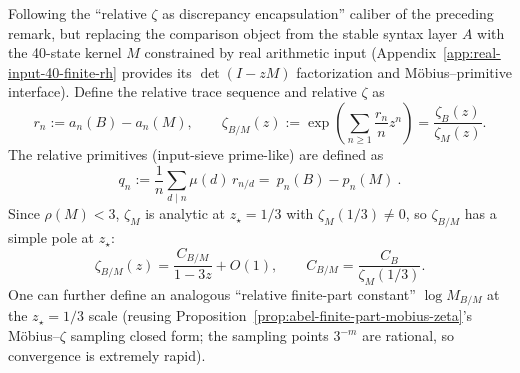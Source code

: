 \begin{remark}\label{rem:relative-zeta-sync-vs-real-input}
Following the ``relative \(\zeta\) as discrepancy encapsulation'' caliber of the preceding remark, but replacing the comparison object from the stable syntax layer \(A\) with the 40-state kernel \(M\) constrained by real arithmetic input (Appendix~\ref{app:real-input-40-finite-rh} provides its \(\det(I-zM)\) factorization and M\"obius--primitive interface).
Define the relative trace sequence and relative \(\zeta\) as
\[
r_n:=a_n(B)-a_n(M),\qquad
\zeta_{B/M}(z):=\exp\!\left(\sum_{n\ge 1}\frac{r_n}{n}z^n\right)=\frac{\zeta_B(z)}{\zeta_M(z)}.
\]
The relative primitives (input-sieve prime-like) are defined as
\[
q_n:=\frac{1}{n}\sum_{d\mid n}\mu(d)\,r_{n/d}=\boxed{\ p_n(B)-p_n(M)\ }.
\]
Since \(\rho(M)<3\), \(\zeta_M\) is analytic at \(z_\star=1/3\) with \(\zeta_M(1/3)\neq 0\), so \(\zeta_{B/M}\) has a simple pole at \(z_\star\):
$$
\zeta_{B/M}(z)=\frac{C_{B/M}}{1-3z}+O(1),
\qquad
C_{B/M}=\frac{C_B}{\zeta_M(1/3)}.
$$
One can further define an analogous ``relative finite-part constant'' \(\log M_{B/M}\) at the \(z_\star=1/3\) scale (reusing Proposition~\ref{prop:abel-finite-part-mobius-zeta}'s M\"obius--\(\zeta\) sampling closed form; the sampling points \(3^{-m}\) are rational, so convergence is extremely rapid).


\end{remark}
